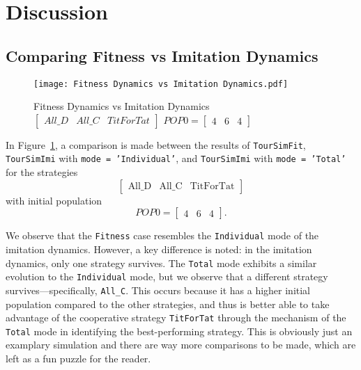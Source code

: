 \section{Discussion}
\subsection{Comparing Fitness vs Imitation Dynamics}
	\begin{figure}[h]
	      \centering
	      \texttt{[image: Fitness Dynamics vs Imitation Dynamics.pdf]}
	      \caption{Fitness Dynamics vs Imitation Dynamics $\begin{bmatrix}All\_D&All\_C&TitForTat\end{bmatrix}$ $POP0=\begin{bmatrix}4&6&4\end{bmatrix}$}
	      \label{fig:Fitness Dynamics vs Imitation Dynamics}
	\end{figure}
In Figure~\ref{fig:Fitness Dynamics vs Imitation Dynamics}, a comparison is made between the results of \texttt{TourSimFit}, \texttt{TourSimImi} with \texttt{mode = 'Individual'}, and \texttt{TourSimImi} with \texttt{mode = 'Total'} for the strategies 
\[
\begin{bmatrix} \text{All\_D} & \text{All\_C} & \text{TitForTat} \end{bmatrix}
\]
with initial population 
\[
POP0 = \begin{bmatrix} 4 & 6 & 4 \end{bmatrix}.
\]

We observe that the \texttt{Fitness} case resembles the \texttt{Individual} mode of the imitation dynamics. However, a key difference is noted: in the imitation dynamics, only one strategy survives. The \texttt{Total} mode exhibits a similar evolution to the \texttt{Individual} mode, but we observe that a different strategy survives—specifically, \texttt{All\_C}. This occurs because it has a higher initial population compared to the other strategies, and thus is better able to take advantage of the cooperative strategy \texttt{TitForTat} through the mechanism of the \texttt{Total} mode in identifying the best-performing strategy. This is obviously just an examplary simulation and there are way more comparisons to be made, which are left as a fun puzzle for the reader.


